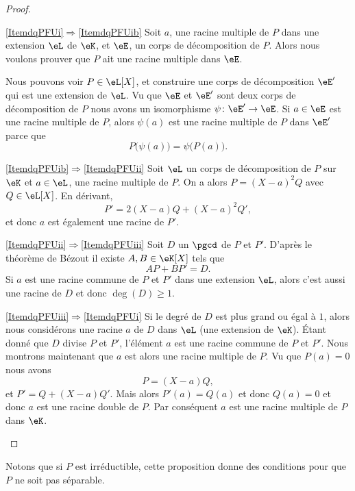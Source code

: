 \begin{proof}
    \begin{subproof}
    \item[\ref{ItemdqPFUi}\( \Rightarrow\)\ref{ItemdqPFUib}] Soit \( a\), une racine multiple de \( P\) dans une extension \( \eL\) de \( \eK\), et \( \eE\), un corps de décomposition de \( P\). Alors nous voulons prouver que \( P\) ait une racine multiple dans \( \eE\).

        Nous pouvons voir \( P\in \eL[X]\), et construire une corps de décomposition \( \eE'\) qui est une extension de \( \eL\). Vu que \( \eE\) et \( \eE'\) sont deux corps de décomposition de \( P\)
        nous avons un isomorphisme \( \psi\colon \eE'\to \eE\). Si \( a\in \eE\) est une racine multiple de \( P\), alors \( \psi(a)\) est une racine multiple de \( P\) dans \( \eE'\) parce que
        \begin{equation}
            P\big( \psi(a) \big)=\psi\big( P(a) \big).
        \end{equation}
    \item[\ref{ItemdqPFUib}\( \Rightarrow\)\ref{ItemdqPFUii}] Soit \( \eL\) un corps de décomposition de \( P\) sur \( \eK\) et \( a\in \eL\), une racine multiple de \( P\). On a alors \( P=(X-a)^2Q\) avec \( Q\in \eL[X]\). En dérivant,
        \begin{equation}
            P'=2(X-a)Q+(X-a)^2Q',
        \end{equation}
        et donc \( a\) est également une racine de \( P'\).
    \item[\ref{ItemdqPFUii}\( \Rightarrow\)\ref{ItemdqPFUiii}] Soit \( D\) un \( \pgcd\) de \( P\) et \( P'\). D'après le théorème de Bézout il existe \( A,B\in \eK[X]\) tels que
        \begin{equation}
            AP+BP'=D.
        \end{equation}
        Si \( a\) est une racine commune de \( P\) et \( P'\) dans une extension \( \eL\), alors c'est aussi une racine de \( D\) et donc \( \deg(D)\geq 1\).
    \item[\ref{ItemdqPFUiii}\(\Rightarrow\)\ref{ItemdqPFUi}] Si le degré de \( D\) est plus grand ou égal à \( 1\), alors nous considérons une racine \( a\) de \( D\) dans \( \eL\) (une extension de \( \eK\)). Étant donné que \( D\) divise \( P\) et \( P'\), l'élément \( a\) est une racine commune de \( P\) et \( P'\). Nous montrons maintenant que \( a\) est alors une racine multiple de \( P\). Vu que \( P(a)=0\) nous avons
        \begin{equation}
            P=(X-a)Q,
        \end{equation}
        et \( P'=Q+(X-a)Q'\). Mais alors \( P'(a)=Q(a)\) et donc \( Q(a)=0\) et donc \( a\) est une racine double de \( P\). Par conséquent \( a\) est une racine multiple de \( P\) dans \( \eK\).
    \end{subproof}
\end{proof}
Notons que si \( P\) est irréductible, cette proposition donne des conditions pour que \( P\) ne soit pas séparable.

